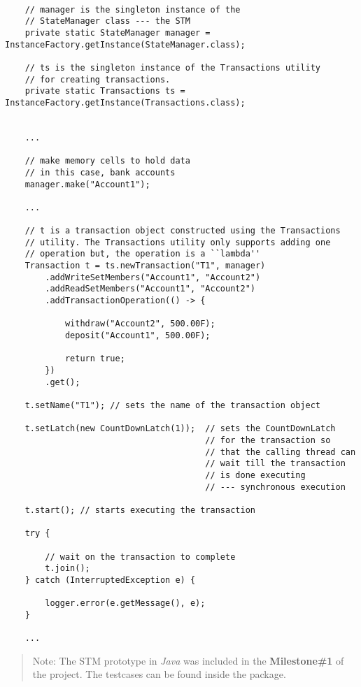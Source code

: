 \documentclass[../main]{subfiles}
\begin{document}
  \begin{lstlisting}

    // manager is the singleton instance of the
    // StateManager class --- the STM
    private static StateManager manager = InstanceFactory.getInstance(StateManager.class);

    // ts is the singleton instance of the Transactions utility 
    // for creating transactions.
    private static Transactions ts = InstanceFactory.getInstance(Transactions.class);


    ...

    // make memory cells to hold data
    // in this case, bank accounts
    manager.make("Account1");

    ...

    // t is a transaction object constructed using the Transactions 
    // utility. The Transactions utility only supports adding one
    // operation but, the operation is a ``lambda''
    Transaction t = ts.newTransaction("T1", manager)
        .addWriteSetMembers("Account1", "Account2")
        .addReadSetMembers("Account1", "Account2")
        .addTransactionOperation(() -> {
            
            withdraw("Account2", 500.00F);
            deposit("Account1", 500.00F);
            
            return true;
        })
        .get();
    
    t.setName("T1"); // sets the name of the transaction object
    
    t.setLatch(new CountDownLatch(1));  // sets the CountDownLatch
                                        // for the transaction so 
                                        // that the calling thread can
                                        // wait till the transaction
                                        // is done executing 
                                        // --- synchronous execution
    
    t.start(); // starts executing the transaction
    
    try {
        
        // wait on the transaction to complete
        t.join();
    } catch (InterruptedException e) {
        
        logger.error(e.getMessage(), e);
    }

    ...

  \end{lstlisting}

  \par
  \begin{verse}
    Note: The STM prototype in {\em Java} was included in the {\bf Milestone\#1} of the project. The testcases can be found inside the  package.
  \end{verse}
\end{document}
